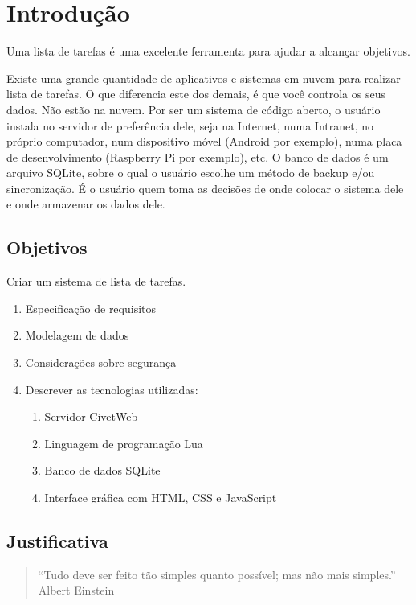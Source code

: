 
\chapter{Introdução}

Uma lista de tarefas é uma excelente ferramenta para ajudar a alcançar objetivos.

Existe uma grande quantidade de aplicativos e sistemas em nuvem para realizar lista de tarefas. O que diferencia este dos demais, é que você controla os seus dados. Não estão na nuvem. Por ser um sistema de código aberto, o usuário instala no servidor de preferência dele, seja na Internet, numa Intranet, no próprio computador, num dispositivo móvel (Android por exemplo), numa placa de desenvolvimento (Raspberry Pi por exemplo), etc. O banco de dados é um arquivo SQLite, sobre o qual o usuário escolhe um método de backup e/ou sincronização. É o usuário quem toma as decisões de onde colocar o sistema dele e onde armazenar os dados dele.

\section{Objetivos}

Criar um sistema de lista de tarefas.

\begin{enumerate}
	\item Especificação de requisitos
	\item Modelagem de dados
	\item Considerações sobre segurança
	\item Descrever as tecnologias utilizadas:
	\begin{enumerate}
		\item Servidor CivetWeb
		\item Linguagem de programação Lua
		\item Banco de dados SQLite
		\item Interface gráfica com HTML, CSS e JavaScript
	\end{enumerate}
\end{enumerate}

\section{Justificativa}

\begin{quote}
``Tudo deve ser feito tão simples quanto possível; mas não mais simples.''
Albert Einstein
\end{quote}

